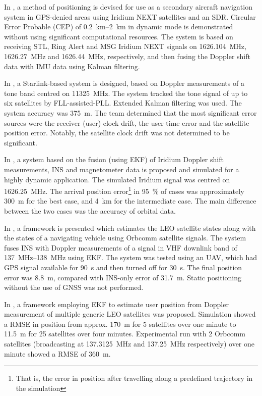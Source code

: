 In \cite{sop01}, a method of positioning is devised for use as a secondary aircraft navigation system in GPS-denied areas using Iridium NEXT satellites and an SDR. Circular Error Probable (CEP) of \qtyrange{0.2}{2}{\km} in dynamic mode is demonstrated without using significant computational resources. The system is based on receiving STL, Ring Alert and MSG Iridium NEXT signals on \qty{1626.104}{\mega\hertz}, \qty{1626.27}{\mega\hertz} and \qty{1626.44}{\mega\hertz}, respectively, and then fusing the Doppler shift data with IMU data using Kalman filtering.

In \cite{sop04}, a Starlink-based system is designed, based on Doppler measurements of a tone band centred on \qty{11 325}{\mega\hertz}. The system tracked the tone signal of up to six satellites by FLL-assisted-PLL. Extended Kalman filtering was used. The system accuracy was \qty{375}{\metre}. The team determined that the most significant error sources were the receiver (user) clock drift, the user time error and the satellite position error. Notably, the satellite clock drift was not determined to be significant.

In \cite{sop05}, a system based on the fusion (using EKF) of Iridium Doppler shift measurements, INS and magnetometer data is proposed and simulated for a highly dynamic application. The simulated Iridium signal was centred on \qty{1626.25}{\mega\hertz}. The arrival position error\footnote{That is, the error in position after travelling along a predefined trajectory in the simulation} in \qty{95}{\percent} of cases was approximately \qty{300}{\metre} for the best case, and \qty{4}{\km} for the intermediate case. The main difference between the two cases was the accuracy of orbital data.

In \cite{sop08}, a framework is presented which estimates the LEO satellite states along with the states of a navigating vehicle using Orbcomm satellite signals. The system fuses INS with Doppler measurements of a signal in VHF downlink band of \qtyrange{137}{138}{\mega\hertz} using EKF. The system was tested using an UAV, which had GPS signal available for \qty{90}{\s} and then turned off for \qty{30}{\s}. The final position error was \qty{8.8}{\m}, compared with INS-only error of \qty{31.7}{\m}. Static positioning without the use of GNSS was not performed.

In \cite{sop10}, a framework employing EKF to estimate user position from Doppler measurement of multiple generic LEO satellites was proposed. Simulation showed a RMSE in position from approx. \qty{170}{\m} for 5 satellites over one minute to \qty{11.5}{\m} for 25 satellites over four minutes. Experimental run with 2 Orbcomm satellites (broadcasting at \qty{137.3125}{\mega\hertz} and \qty{137.25}{\mega\hertz} respectively) over one minute showed a RMSE of \qty{360}{\m}.

